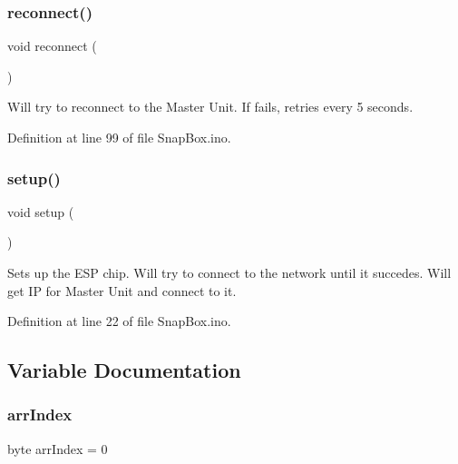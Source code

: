 \mbox{\label{_snap_box_8ino_a4bcd6ce7d04c38f8c4ff908d1fc50f86}} 
\subsubsection{\texorpdfstring{reconnect()}{reconnect()}}
{\footnotesize\ttfamily void reconnect (\begin{DoxyParamCaption}{ }\end{DoxyParamCaption})}

Will try to reconnect to the Master Unit. If fails, retries every 5 seconds. 

Definition at line 99 of file Snap\+Box.\+ino.

\mbox{\label{_snap_box_8ino_a4fc01d736fe50cf5b977f755b675f11d}} 
\subsubsection{\texorpdfstring{setup()}{setup()}}
{\footnotesize\ttfamily void setup (\begin{DoxyParamCaption}{ }\end{DoxyParamCaption})}

Sets up the E\+SP chip. Will try to connect to the network until it succedes. Will get IP for Master Unit and connect to it. 

Definition at line 22 of file Snap\+Box.\+ino.



\subsection{Variable Documentation}
\mbox{\label{_snap_box_8ino_a9a1dfa6d1aaeda043479fb5d16e28a65}} 
\subsubsection{\texorpdfstring{arr\+Index}{arrIndex}}
{\footnotesize\ttfamily byte arr\+Index = 0}



